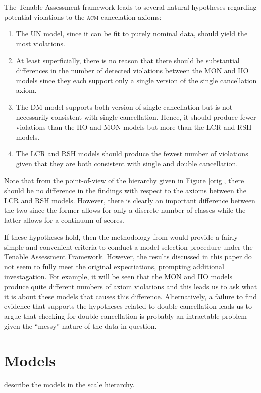 \documentclass[12pt]{article}
\begin{document}
The Tenable Assessment framework  leads to several natural hypotheses regarding potential violations to the \textsc{acm} cancelation axioms:
\begin{enumerate}
\item The UN model, since it can be fit to purely nominal data, should yield the most violations.
\item At least superficially, there is no reason that there should be substantial differences in the number of detected violations between the MON and IIO models since they each support only a single version of the single cancellation axiom.
\item The DM model supports both version of single cancellation but is not necessarily consistent with single cancellation. Hence, it should produce fewer violations than the IIO and MON models but more than the LCR and RSH models.
\item The LCR and RSH models should produce the fewest number of violations given that they are both consistent with single and double cancellation.
\end{enumerate}
Note that from the point-of-view of the hierarchy given in Figure \ref{orig}, there should be no difference in the findings with respect to the axioms between the LCR and RSH models. However, there is clearly an important difference between the two since the former allows for only a discrete number of classes while the latter allows for a continuum of scores. 

If these hypotheses hold, then the methodology from  would provide a fairly simple and convenient criteria to conduct a model selection procedure under the Tenable Assessment Framework. However, the results discussed in this paper do not seem to fully meet the original expectiations, prompting additional investagation. For example, it will be seen that the MON and IIO models produce quite different numbers of axiom violations and this leads us to ask what it is about these models that causes this difference. Alternatively, a failure to find evidence that supports the hypotheses related to double cancellation leads us to argue that checking for double cancellation is probably an intractable problem given the ``messy'' nature of the data in question.

\section{Models}
describe the models in the scale hierarchy. 
\end{document}
